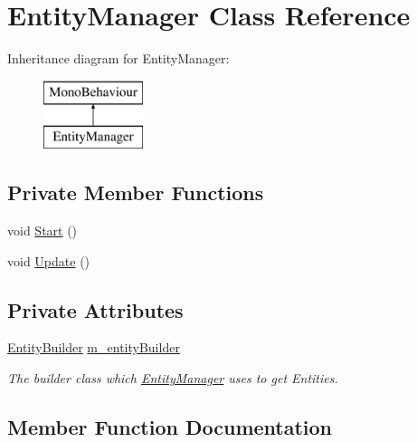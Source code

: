 \hypertarget{class_entity_manager}{}\section{Entity\+Manager Class Reference}
\label{class_entity_manager}
Inheritance diagram for Entity\+Manager\+:\begin{figure}[H]
\begin{center}
\leavevmode
\includegraphics[height=2.000000cm]{class_entity_manager}
\end{center}
\end{figure}
\subsection*{Private Member Functions}
\begin{DoxyCompactItemize}
\item 
void \hyperlink{class_entity_manager_a3e72b6eace1b9c16b5267ca25a1e4fa8}{Start} ()
\item 
void \hyperlink{class_entity_manager_a842b748cc70c7e1366a57df0475b5b96}{Update} ()
\end{DoxyCompactItemize}
\subsection*{Private Attributes}
\begin{DoxyCompactItemize}
\item 
\hyperlink{class_entity_builder}{Entity\+Builder} \hyperlink{class_entity_manager_a0a1c610cd196c0832945dfd10009b18f}{m\+\_\+entity\+Builder}
\begin{DoxyCompactList}\small\item\em The builder class which \hyperlink{class_entity_manager}{Entity\+Manager} uses to get Entities. \end{DoxyCompactList}\end{DoxyCompactItemize}


\subsection{Member Function Documentation}
\mbox{\label{class_entity_manager_a3e72b6eace1b9c16b5267ca25a1e4fa8}} 
